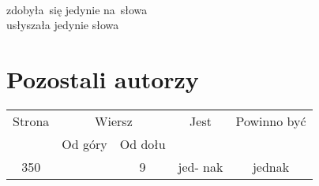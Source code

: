 \documentclass[a4paper,11pt]{article}
\begin{document}
\begin{center}
\end{center}

\vspace{\spaceTwo}


\noindent
{} \\
\Jest  zdobyła~się jedynie na~słowa \\
\Powin usłyszała jedynie słowa \\












\newpage
\section{Pozostali autorzy}

\vspace{\spaceTwo}




\vspace{0em}





\begin{center}

  \begin{tabular}{|c|c|c|c|c|}
    \hline
    Strona & \multicolumn{2}{c|}{Wiersz} & Jest
                              & Powinno być \\ \cline{2-3}
    & Od góry & Od dołu & & \\
    \hline
    350 & & 9 & jed- nak & jednak \\
    \hline
  \end{tabular}

\end{center}

\vspace{\spaceTwo}
\end{document}
